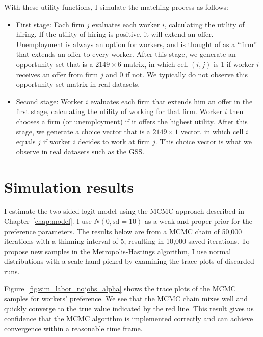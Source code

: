 With these utility functions, I simulate the matching process as follows:

\begin{itemize}
\item{First stage:} Each firm $j$ evaluates each worker $i$, calculating the utility of
  hiring. If the utility of hiring is positive, it will extend an offer.
  Unemployment is always an option for workers, and is thought of as a ``firm''
  that extends an offer to every worker. After
  this stage, we generate an opportunity set that is a $2149 \times 6$ matrix,
  in which cell $(i, j)$ is 1 if worker $i$ receives an offer from firm $j$ and
  0 if not. We typically do not observe this opportunity set matrix in real datasets.
\item{Second stage:} Worker $i$ evaluates each firm that extends him an offer in
  the first stage, calculating the utility of working for that firm. Worker $i$
  then chooses a firm (or unemployment) if it offers the highest utility. After this
  stage, we generate a choice vector that is a $2149 \times 1$ vector, in which
  cell $i$ equals $j$ if worker $i$ decides to work at firm $j$. This choice
  vector is what we observe in real datasets such as the GSS. 
\end{itemize}

\section{Simulation results}

I estimate the two-sided logit model using the MCMC approach described in
Chapter~\ref{chap:model}. I use $N(0, \text{sd}=10)$ as a weak and proper prior for the preference
parameters. The results below are from a MCMC chain of 50,000
iterations with a thinning interval of 5, resulting in 10,000 saved iterations.
To propose new samples in the Metropolis-Hastings algorithm, I use normal
distributions with a scale hand-picked by examining the trace plots of discarded runs.

Figure~\ref{fig:sim_labor_nojobs_alpha} shows the trace plots of the MCMC
samples for workers' preference. We see that the MCMC chain mixes well and
quickly converge to the true value indicated by the red line. This result gives
us confidence that the MCMC algorithm is implemented correctly and can achieve
convergence within a reasonable time frame.

